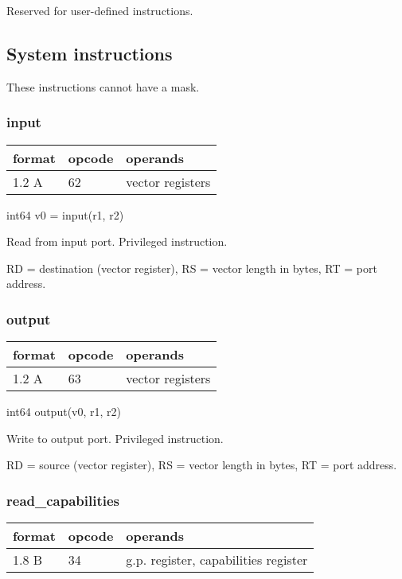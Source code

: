 \documentclass[forwardcom.tex]{subfiles}
\begin{document}
Reserved for user-defined instructions.
\vspace{2mm}

\subsection{System instructions}
These instructions cannot have a mask.
\vspace{2mm}

\subsubsection{input}

\label{table:inputInstruction}
\begin{tabular}{|p{12mm}|p{12mm}|p{110mm}|}
\hline
\bfseries format & \bfseries opcode & \bfseries operands \\ \hline
1.2 A & 62 & vector registers \\ \hline
\end{tabular}
\vspace{2mm}

int64 v0 = input(r1, r2)
\vspace{2mm}

Read from input port. Privileged instruction.
\vspace{2mm}

RD = destination (vector register),
RS = vector length in bytes, RT = port address.

\subsubsection{output}
\label{table:outputInstruction}
\begin{tabular}{|p{12mm}|p{12mm}|p{110mm}|}
\hline
\bfseries format & \bfseries opcode & \bfseries operands \\ \hline
1.2 A & 63 & vector registers \\ \hline
\end{tabular}
\vspace{2mm}

int64 output(v0, r1, r2)
\vspace{2mm}

Write to output port. Privileged instruction.
\vspace{2mm}

RD = source (vector register),
RS = vector length in bytes, RT = port address.

\subsubsection{read\_capabilities}
\label{table:readCapabilitiesInstruction}
\begin{tabular}{|p{12mm}|p{12mm}|p{110mm}|}
\hline
\bfseries format & \bfseries opcode & \bfseries operands \\ \hline
1.8 B & 34 & g.p. register, capabilities register \\ \hline
\end{tabular}
\vspace{2mm}
\end{document}
